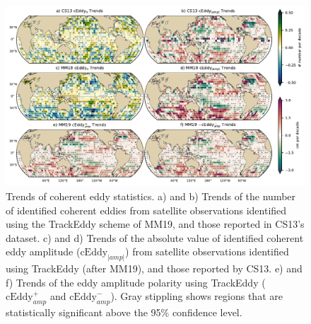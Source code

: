 \documentclass[draft,linenumbers]{agujournal2019}
\newcommand{\cEddy}{\textrm{cEddy}}
\begin{document}
	\begin{figure}
	    \centering
	    \includegraphics[width=1\textwidth]{figures/all_trackeddy_trends_all_regular.pdf}
	    \caption{Trends of coherent eddy statistics. a) and b) Trends of the number of identified coherent eddies from satellite observations identified using the TrackEddy scheme of MM19, and those reported in CS13's dataset. c) and d) Trends of the absolute value of identified coherent eddy amplitude ($\cEddy_{|amp|}$) from satellite observations identified using TrackEddy (after MM19), and those reported by CS13. e) and f) Trends of the eddy amplitude polarity using TrackEddy ($\cEddy_{amp}^+$ and $\cEddy_{amp}^-$). Gray stippling shows regions that are statistically significant above the 95\% confidence level.}
	    \label{fig:eddy_stats_trends}
	\end{figure}


	
\end{document}
